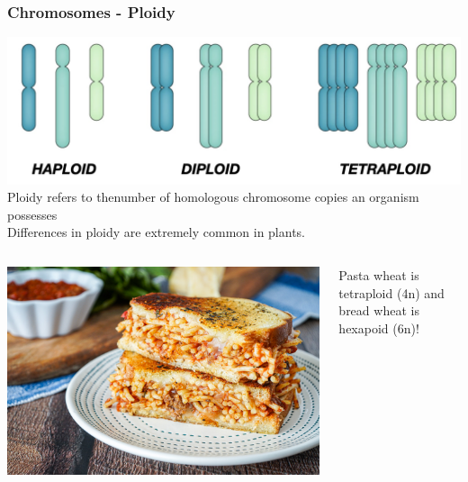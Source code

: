 \documentclass{beamer}
\begin{document}
	
	
	
	
\begin{frame}
	\frametitle{Chromosomes - Ploidy}
	
	\includegraphics[keepaspectratio, width  =\textwidth]{img/ploidy}
	Ploidy refers to thenumber of homologous chromosome copies an organism possesses\\
	Differences in ploidy are extremely common in plants.
\pause	
\bigskip
\begin{columns}
	\begin{column}{0.2\textwidth}
		\includegraphics[keepaspectratio, width  =\textwidth]{img/spaghettiSandwich}
\end{column}	
\begin{column}{0.8\textwidth}
	Pasta wheat is tetraploid (4n) and bread wheat is hexapoid (6n)!
	\end{column}
\end{columns}
\end{frame}
	
\end{document}
